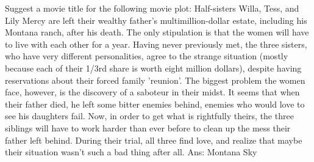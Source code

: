 \documentclass{article}
\begin{document}
\begin{tcolorbox}[colframe=black,colback=white]
Suggest a movie title for the following movie plot: Half-sisters Willa, Tess, and Lily Mercy are left their wealthy father's multimillion-dollar estate, including his Montana ranch, after his death. The only stipulation is that the women will have to live with each other for a year. Having never previously met, the three sisters, who have very different personalities, agree to the strange situation (mostly because each of their 1/3rd share is worth eight million dollars), despite having reservations about their forced family 'reunion'. The biggest problem the women face, however, is the discovery of a saboteur in their midst. It seems that when their father died, he left some bitter enemies behind, enemies who would love to see his daughters fail. Now, in order to get what is rightfully theirs, the three siblings will have to work harder than ever before to clean up the mess their father left behind. During their trial, all three find love, and realize that maybe their situation wasn't such a bad thing after all.
Ans: Montana Sky


\end{tcolorbox}
\end{document}
